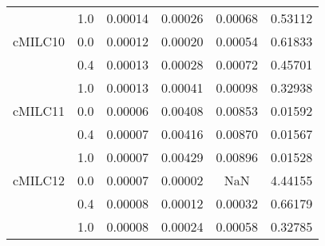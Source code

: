 \begin{longtable}{cccccc}
     & 1.0 & 0.00014 & 0.00026 & 0.00068 & 0.53112 \\
cMILC10 & 0.0 & 0.00012 & 0.00020 & 0.00054 & 0.61833 \\
     & 0.4 & 0.00013 & 0.00028 & 0.00072 & 0.45701 \\
     & 1.0 & 0.00013 & 0.00041 & 0.00098 & 0.32938 \\
cMILC11 & 0.0 & 0.00006 & 0.00408 & 0.00853 & 0.01592 \\
     & 0.4 & 0.00007 & 0.00416 & 0.00870 & 0.01567 \\
     & 1.0 & 0.00007 & 0.00429 & 0.00896 & 0.01528 \\
cMILC12 & 0.0 & 0.00007 & 0.00002 & NaN & 4.44155 \\
     & 0.4 & 0.00008 & 0.00012 & 0.00032 & 0.66179 \\
     & 1.0 & 0.00008 & 0.00024 & 0.00058 & 0.32785 \\
\end{longtable}
